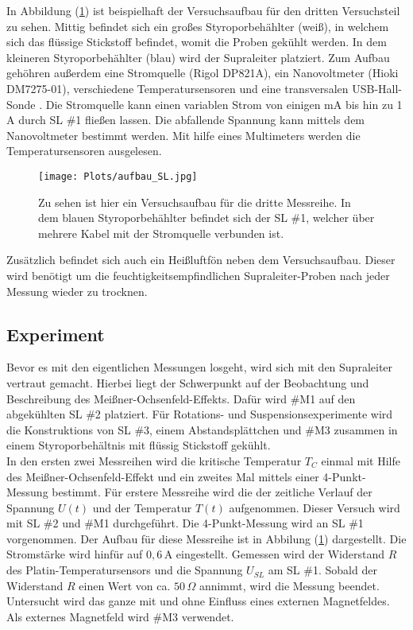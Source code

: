 In Abbildung (\ref{abb:aufbau}) ist beispielhaft der Versuchsaufbau f\"ur den dritten Versuchsteil zu sehen.
Mittig befindet sich ein gro{\ss}es Styroporbeh\"ahlter (wei{\ss}), in welchem sich das fl\"ussige Stickstoff befindet, womit die Proben gek\"uhlt werden.
In dem kleineren Styroporbeh\"ahlter (blau) wird der Supraleiter platziert.
Zum Aufbau geh\"ohren au{\ss}erdem eine Stromquelle (Rigol DP821A), ein Nanovoltmeter (Hioki DM7275-01), verschiedene Temperatursensoren und eine transversalen USB-Hall-Sonde .
Die Stromquelle kann einen variablen Strom von einigen mA bis hin zu 1 A durch SL \#1 flie{\ss}en lassen.
Die abfallende Spannung kann mittels dem Nanovoltmeter bestimmt werden.
Mit hilfe eines Multimeters werden die Temperatursensoren ausgelesen.
\begin{figure}[hbtp]
	\centering
	\texttt{[image: Plots/aufbau\_SL.jpg]}
	\caption{Zu sehen ist hier ein Versuchsaufbau f\"ur die dritte Messreihe. In dem blauen Styroporbeh\"ahlter befindet sich der SL \#1, welcher \"uber mehrere Kabel mit der Stromquelle verbunden ist.}
	\label{abb:aufbau}
\end{figure}
Zus\"atzlich befindet sich auch ein Heißluftfön neben dem Versuchsaufbau.
Dieser wird ben\"otigt um die feuchtigkeitsempfindlichen Supraleiter-Proben nach jeder Messung wieder zu trocknen.

\subsection{Experiment}
Bevor es mit den eigentlichen Messungen losgeht, wird sich mit den Supraleiter vertraut gemacht.
Hierbei liegt der Schwerpunkt auf der Beobachtung und Beschreibung des Meißner-Ochsenfeld-Effekts.
Daf\"ur wird \#M1 auf den abgekühlten SL \#2 platziert.
Für Rotations- und Suspensionsexperimente wird die Konstruktions von SL \#3, einem Abstandsplättchen und \#M3 zusammen in einem Styroporbehältnis mit fl\"ussig Stickstoff gek\"uhlt. \\

In den ersten zwei Messreihen wird die kritische Temperatur $T_C$ einmal mit Hilfe des Meißner-Ochsenfeld-Effekt und ein zweites Mal mittels einer 4-Punkt-Messung bestimmt.
F\"ur erstere Messreihe wird die der zeitliche Verlauf der Spannung $U(t)$ und der Temperatur $T(t)$ aufgenommen.
Dieser Versuch wird mit SL \#2 und \#M1 durchgef\"uhrt.
Die 4-Punkt-Messung wird an SL \#1 vorgenommen.
Der Aufbau f\"ur diese Messreihe ist in Abbilung (\ref{abb:aufbau}) dargestellt.
Die Stromst\"arke wird hinf\"ur auf $0,6 \,$A eingestellt.
Gemessen wird der Widerstand $R$ des Platin-Temperatursensors und die Spannung $U_{SL}$ am SL \#1.
Sobald der Widerstand $R$ einen Wert von ca. $50 \, \Omega$ annimmt, wird die Messung beendet.
Untersucht wird das ganze mit und ohne Einfluss eines externen Magnetfeldes.
Als externes Magnetfeld wird \#M3 verwendet. \\

